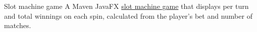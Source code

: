 {Slot machine game}
{}
{A Maven JavaFX \href{https://github.com/jacobarchambault/slotmachine}{slot machine game} that displays per turn and total winnings on each spin, calculated from the player's bet and number of matches.}
